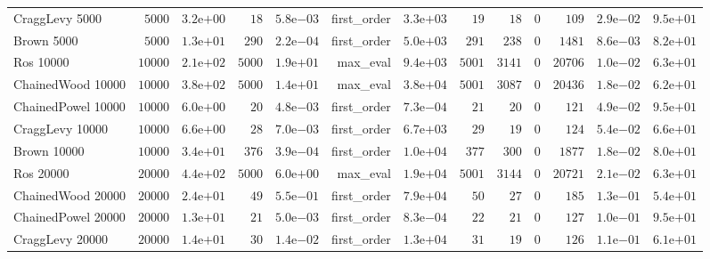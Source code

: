 \begin{longtable}[c]{lrrrrrrrrrrrr}
CraggLevy 5000 & \( 5000\) & \( 3.2\)e\(+00\) & \(   18\) & \( 5.8\)e\(-03\) & first\_order & \( 3.3\)e\(+03\) & \(   19\) & \(   18\) & \(    0\) & \(  109\) & \( 2.9\)e\(-02\) & \( 9.5\)e\(+01\) \\
Brown 5000 & \( 5000\) & \( 1.3\)e\(+01\) & \(  290\) & \( 2.2\)e\(-04\) & first\_order & \( 5.0\)e\(+03\) & \(  291\) & \(  238\) & \(    0\) & \( 1481\) & \( 8.6\)e\(-03\) & \( 8.2\)e\(+01\) \\
Ros 10000 & \(10000\) & \( 2.1\)e\(+02\) & \( 5000\) & \( 1.9\)e\(+01\) & max\_eval & \( 9.4\)e\(+03\) & \( 5001\) & \( 3141\) & \(    0\) & \(20706\) & \( 1.0\)e\(-02\) & \( 6.3\)e\(+01\) \\
ChainedWood 10000 & \(10000\) & \( 3.8\)e\(+02\) & \( 5000\) & \( 1.4\)e\(+01\) & max\_eval & \( 3.8\)e\(+04\) & \( 5001\) & \( 3087\) & \(    0\) & \(20436\) & \( 1.8\)e\(-02\) & \( 6.2\)e\(+01\) \\
ChainedPowel 10000 & \(10000\) & \( 6.0\)e\(+00\) & \(   20\) & \( 4.8\)e\(-03\) & first\_order & \( 7.3\)e\(-04\) & \(   21\) & \(   20\) & \(    0\) & \(  121\) & \( 4.9\)e\(-02\) & \( 9.5\)e\(+01\) \\
CraggLevy 10000 & \(10000\) & \( 6.6\)e\(+00\) & \(   28\) & \( 7.0\)e\(-03\) & first\_order & \( 6.7\)e\(+03\) & \(   29\) & \(   19\) & \(    0\) & \(  124\) & \( 5.4\)e\(-02\) & \( 6.6\)e\(+01\) \\
Brown 10000 & \(10000\) & \( 3.4\)e\(+01\) & \(  376\) & \( 3.9\)e\(-04\) & first\_order & \( 1.0\)e\(+04\) & \(  377\) & \(  300\) & \(    0\) & \( 1877\) & \( 1.8\)e\(-02\) & \( 8.0\)e\(+01\) \\
Ros 20000 & \(20000\) & \( 4.4\)e\(+02\) & \( 5000\) & \( 6.0\)e\(+00\) & max\_eval & \( 1.9\)e\(+04\) & \( 5001\) & \( 3144\) & \(    0\) & \(20721\) & \( 2.1\)e\(-02\) & \( 6.3\)e\(+01\) \\
ChainedWood 20000 & \(20000\) & \( 2.4\)e\(+01\) & \(   49\) & \( 5.5\)e\(-01\) & first\_order & \( 7.9\)e\(+04\) & \(   50\) & \(   27\) & \(    0\) & \(  185\) & \( 1.3\)e\(-01\) & \( 5.4\)e\(+01\) \\
ChainedPowel 20000 & \(20000\) & \( 1.3\)e\(+01\) & \(   21\) & \( 5.0\)e\(-03\) & first\_order & \( 8.3\)e\(-04\) & \(   22\) & \(   21\) & \(    0\) & \(  127\) & \( 1.0\)e\(-01\) & \( 9.5\)e\(+01\) \\
CraggLevy 20000 & \(20000\) & \( 1.4\)e\(+01\) & \(   30\) & \( 1.4\)e\(-02\) & first\_order & \( 1.3\)e\(+04\) & \(   31\) & \(   19\) & \(    0\) & \(  126\) & \( 1.1\)e\(-01\) & \( 6.1\)e\(+01\) \\

\end{longtable}
